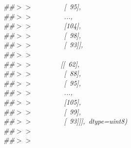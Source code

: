 \mbox{}\textit{\#\#$>$$>$\ \ \ \ \ \ \ \ \ [\ 95],} \\
\mbox{}\textit{\#\#$>$$>$\ \ \ \ \ \ \ \ \ ...,\ } \\
\mbox{}\textit{\#\#$>$$>$\ \ \ \ \ \ \ \ \ [104],} \\
\mbox{}\textit{\#\#$>$$>$\ \ \ \ \ \ \ \ \ [\ 98],} \\
\mbox{}\textit{\#\#$>$$>$\ \ \ \ \ \ \ \ \ [\ 93]],} \\
\mbox{}\textit{\#\#$>$$>$\ } \\
\mbox{}\textit{\#\#$>$$>$\ \ \ \ \ \ \ \ [[\ 62],} \\
\mbox{}\textit{\#\#$>$$>$\ \ \ \ \ \ \ \ \ [\ 88],} \\
\mbox{}\textit{\#\#$>$$>$\ \ \ \ \ \ \ \ \ [\ 95],} \\
\mbox{}\textit{\#\#$>$$>$\ \ \ \ \ \ \ \ \ ...,\ } \\
\mbox{}\textit{\#\#$>$$>$\ \ \ \ \ \ \ \ \ [105],} \\
\mbox{}\textit{\#\#$>$$>$\ \ \ \ \ \ \ \ \ [\ 99],} \\
\mbox{}\textit{\#\#$>$$>$\ \ \ \ \ \ \ \ \ [\ 93]]],\ dtype=uint8)} \\
\mbox{}\textit{\#\#$>$$>$\ } \\
\mbox{}\textit{\#\#$>$$>$\ } \\
\mbox{} \\
\mbox{}